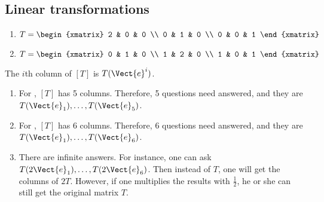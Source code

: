 \subsection{Linear transformations}

\begin{exercise}{4}
  \begin{enumerate}
    \item $T = \begin{xmatrix}
                 2 & 0 & 0 \\
                 0 & 1 & 0 \\
                 0 & 0 & 1
               \end{xmatrix}$

    \item $T = \begin{xmatrix}
                 0 & 1 & 0 \\
                 1 & 2 & 0 \\
                 1 & 0 & 1
               \end{xmatrix}$
  \end{enumerate}
\end{exercise}

\begin{exercise}{8}
  The $i$th column of $[T]$ is $T(\Vect{e}^i)$.

  \begin{enumerate}
    \item For , $[T]$ has 5 columns. Therefore,
          5 questions need answered, and they are $T(\Vect{e}_1), \hdots, T(\Vect{e}_5)$.

    \item For , $[T]$ has 6 columns. Therefore,
          6 questions need answered, and they are $T(\Vect{e}_1), \hdots, T(\Vect{e}_6)$.

    \item There are infinite answers. For instance, one can ask $T(2\Vect{e}_1), \hdots, T(2\Vect{e}_6)$.
          Then instead of $T$, one will get the columns of $2T$. However, if one
          multiplies the results with $\frac{1}{2}$, he or she can still get the
          original matrix $T$.
  \end{enumerate}
\end{exercise}

